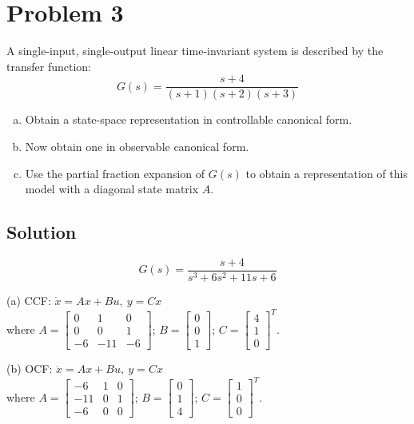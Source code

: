 \documentclass[11pt]{report}
\theoremstyle{definition}
\begin{document}
\section*{Problem 3}
A single-input, single-output linear time-invariant system is described by the transfer function:
$$ G(s) = \frac{s+4}{(s+1)(s+2)(s+3)} $$

\begin{enumerate}[(a), noitemsep]
	\item Obtain a state-space representation in controllable canonical form.
	\item Now obtain one in observable canonical form.
	\item Use the partial fraction expansion of $G(s)$ to obtain a representation of this model with a diagonal state matrix $A$.
\end{enumerate}
\subsection*{Solution}


$$ G(s) = \frac{s+4}{s^3+6s^2+11s+6} $$

\noindent(a) CCF: $\dot{x} = Ax+Bu,~y=Cx$\\ where $A = \begin{bmatrix}0 & 1 & 0\\0 & 0 & 1\\-6 & -11 & -6\end{bmatrix}$; $B = \begin{bmatrix}0\\0\\1\end{bmatrix}$; $C = \begin{bmatrix}4\\1\\0\end{bmatrix}^T$.

\noindent(b) OCF: $\dot{x} = Ax+Bu,~y=Cx$\\ where $A = \begin{bmatrix}-6 & 1 & 0\\-11 & 0 & 1\\-6 & 0 & 0\end{bmatrix}$; $B = \begin{bmatrix}0\\1\\4\end{bmatrix}$; $C = \begin{bmatrix}1\\0\\0\end{bmatrix}^T$.
\end{document}
